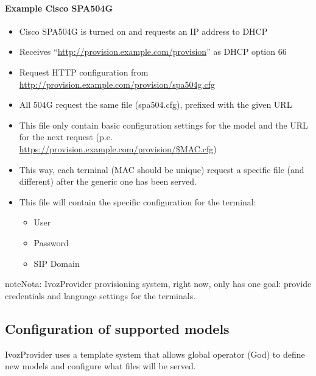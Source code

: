 \documentclass[letterpaper,10pt,spanish]{sphinxmanual}
\begin{document}
\paragraph{Example Cisco SPA504G}
\begin{itemize}
\item {} 
Cisco SPA504G is turned on and requests an IP address to DHCP

\item {} 
Receives “\url{http://provision.example.com/provision}” as DHCP option 66

\item {} 
Request HTTP configuration from \url{http://provision.example.com/provision/spa504g.cfg}

\item {} 
All 504G request the same file (spa504.cfg), prefixed with the given URL

\item {} 
This file only contain basic configuration settings for the model and the URL
for the next request (p.e. \url{https://provision.example.com/provision/\$MAC.cfg})

\item {} 
This way, each terminal (MAC should be unique) request a specific file
(and different) after the generic one has been served.

\item {} 
This file will contain the specific configuration for the terminal:
\begin{itemize}
\item {} 
User

\item {} 
Password

\item {} 
SIP Domain

\end{itemize}

\end{itemize}

\begin{notice}{note}{Nota:}
IvozProvider provisioning system, right now, only has one goal:
provide credentials and language settings for the terminals.
\end{notice}


\subsection{Configuration of supported models}
\label{administration_portal/platform/terminal_manufacturers:configuration-of-supported-models}
IvozProvider uses a template system that allows global operator (God) to
define new models and configure what files will be served.
\end{document}

